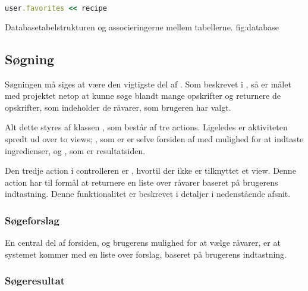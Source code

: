 \begin{lstlisting}[caption={Hvis man har et \classref{User}-objekt i \texttt{user} (som f.eks. returneret med \lstinline{User.find_by_id(42)}) og et \classref{Recipe}-object i \texttt{recipe}, kan opskriften associeres med brugeren med denne linje Ruby-kode.},label=lst:rubymanytomany,language=ruby]
user.favorites << recipe
\end{lstlisting}

  {Databasetabelstrukturen og associeringerne mellem tabellerne.}
  {fig:database}

\subsection{Søgning}
\label{sec:funktionalitet-soegning}
Søgningen må siges at være den vigtigste del af \Foodl. Som beskrevet i , så er målet med projektet netop at kunne søge blandt mange opskrifter og returnere de opskrifter, som indeholder de råvarer, som brugeren har valgt.

Alt dette styres af klassen , som består af tre actions. Ligeledes er aktiviteten spredt ud over to views; , som er er selve forsiden af \Foodl med mulighed for at indtaste ingredienser, og , som er resultatsiden.

Den tredje action i controlleren er , hvortil der ikke er tilknyttet et view. Denne action har til formål at returnere en liste over råvarer baseret på brugerens indtastning. Denne funktionalitet er beskrevet i detaljer i nedenstående afsnit.

\subsubsection{Søgeforslag}
En central del af forsiden, og brugerens mulighed for at vælge råvarer, er at systemet kommer med en liste over forslag, baseret på brugerens indtastning.

\subsubsection{Søgeresultat}



